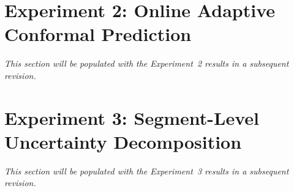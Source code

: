 \section{Experiment 2: Online Adaptive Conformal Prediction}
\label{sec:exp2_results}

\textit{This section will be populated with the Experiment~2 results in a subsequent revision.}

\section{Experiment 3: Segment-Level Uncertainty Decomposition}
\label{sec:exp3_results}

\textit{This section will be populated with the Experiment~3 results in a subsequent revision.}